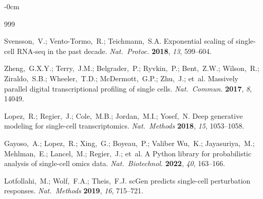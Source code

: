 \documentclass[genes,article,submit,pdftex,oneauthor]{Definitions/mdpi}
\begin{document}
\begin{adjustwidth}{-\extralength}{0cm}





\begin{thebibliography}{999}
\setlength{\itemsep}{0pt}\setlength{\parskip}{0pt}\setlength{\parsep}{0pt}

Svensson,~V.; Vento-Tormo,~R.; Teichmann,~S.A. Exponential scaling of single-cell RNA-seq in the past decade. {\em Nat.\ Protoc.} {\bf 2018}, {\em 13}, 599--604.

Zheng,~G.X.Y.; Terry,~J.M.; Belgrader,~P.; Ryvkin,~P.; Bent,~Z.W.; Wilson,~R.; Ziraldo,~S.B.; Wheeler,~T.D.; McDermott,~G.P.; Zhu,~J.; et~al. Massively parallel digital transcriptional profiling of single cells. {\em Nat.\ Commun.} {\bf 2017}, {\em 8}, 14049.

Lopez,~R.; Regier,~J.; Cole,~M.B.; Jordan,~M.I.; Yosef,~N. Deep generative modeling for single-cell transcriptomics. {\em Nat.\ Methods} {\bf 2018}, {\em 15}, 1053--1058.

Gayoso,~A.; Lopez,~R.; Xing,~G.; Boyeau,~P.; Valiber Wu,~K.; Jayasuriya,~M.; Mehlman,~E.; Lancel,~M.; Regier,~J.; et~al. A Python library for probabilistic analysis of single-cell omics data. {\em Nat.\ Biotechnol.} {\bf 2022}, {\em 40}, 163--166.

Lotfollahi,~M.; Wolf,~F.A.; Theis,~F.J. scGen predicts single-cell perturbation responses. {\em Nat.\ Methods} {\bf 2019}, {\em 16}, 715--721.


\end{thebibliography}
\end{adjustwidth}
\end{document}

